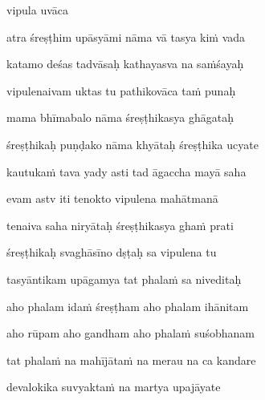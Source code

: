 vipula uvāca~{\dandab}\dontdisplaylinenum 

atra śreṣṭhim upāsyāmi nāma vā tasya ki\.m vada\thinspace{\danda} \dontdisplaylinenum

katamo deśas tadvāsaḥ kathayasva na sa\.mśayaḥ \veg\dontdisplaylinenum

vipulenaivam uktas tu pathikovāca ta\.m punaḥ\thinspace{\dandab} \dontdisplaylinenum

mama bhīmabalo nāma śreṣṭhikasya ghāgataḥ \veg\dontdisplaylinenum

śreṣṭhikaḥ puṇḍako nāma khyātaḥ śreṣṭhika ucyate\thinspace{\dandab} \dontdisplaylinenum

kautuka\.m tava yady asti tad āgaccha mayā saha \veg\dontdisplaylinenum

evam astv iti tenokto vipulena mahātmanā\thinspace{\dandab} \dontdisplaylinenum

tenaiva saha niryātaḥ śreṣṭhikasya gha\.m prati \veg\dontdisplaylinenum

śreṣṭhikaḥ svaghāsīno dṣṭaḥ sa vipulena tu\thinspace{\dandab} \dontdisplaylinenum

tasyāntikam upāgamya tat phala\.m sa niveditaḥ \veg\dontdisplaylinenum

aho phalam ida\.m śreṣṭham aho phalam ihānitam\thinspace{\dandab} \dontdisplaylinenum

aho rūpam aho gandham aho phala\.m suśobhanam \veg\dontdisplaylinenum

tat phala\.m na mahījāta\.m na merau na ca kandare\thinspace{\dandab} \dontdisplaylinenum

devalokika suvyakta\.m na martya upajāyate \veg\dontdisplaylinenum

